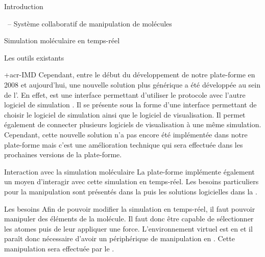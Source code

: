 \documentclass[myfrancais]{mythesis}
\begin{document}
\begin{mypart}{Introduction}
\begin{mychapter}{\myShaddock\ -- Système collaboratif de manipulation de molécules}
\begin{mysection}{Simulation moléculaire en temps-réel}
\begin{mysubsection}{Les outils existants}
\begin{mysubsubsection}{\myacronl+{acr-IMD}}
						Cependant, entre le début du développement de notre plate-forme en 2008 et aujourd'hui, une nouvelle solution plus générique a été développée au sein de l'.
						En effet, \myMDDriver {} est une interface permettant d'utiliser le protocole  avec l'autre logiciel de simulation \myGromacs.
						Il se présente sous la forme d'une interface permettant de choisir le logiciel de simulation ainsi que le logiciel de visualisation.
						Il permet également de connecter plusieurs logiciels de visualisation à une même simulation.
						Cependant, cette nouvelle solution n'a pas encore été implémentée dans notre plate-forme mais c'est une amélioration technique qui sera effectuée dans les prochaines versions de la plate-forme.
					\end{mysubsubsection}
				\end{mysubsection}
			\end{mysection}
			\begin{mysection}{Interaction avec la simulation moléculaire}
				La plate-forme \myShaddock implémente également un moyen d'interagir avec cette simulation en temps-réel.
				Les besoins particuliers pour la manipulation sont présentés dans la  puis les solutions logicielles dans la .
				\begin{mysubsection}{Les besoins}
					Afin de pouvoir modifier la simulation en temps-réel, il faut pouvoir manipuler des éléments de la molécule.
					Il faut donc être capable de sélectionner les atomes puis de leur appliquer une force.
					L'environnement virtuel est en \myThreeD et il paraît donc nécessaire d'avoir un périphérique de manipulation en \myThreeD.
					Cette manipulation sera effectuée par le \myOmni {}.


\end{mysubsection}
\end{mysection}
\end{mychapter}
\end{mypart}
\end{document}
